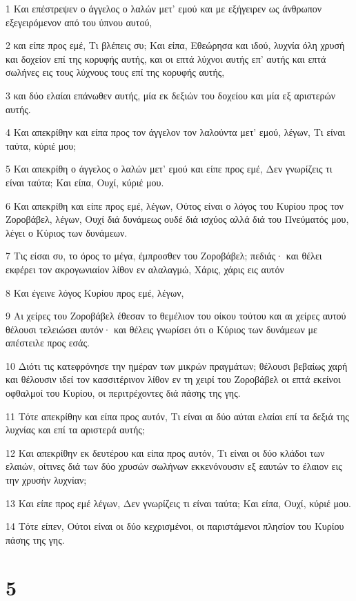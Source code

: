 \par 1 Και επέστρεψεν ο άγγελος ο λαλών μετ' εμού και με εξήγειρεν ως άνθρωπον εξεγειρόμενον από του ύπνου αυτού,
\par 2 και είπε προς εμέ, Τι βλέπεις συ; Και είπα, Εθεώρησα και ιδού, λυχνία όλη χρυσή και δοχείον επί της κορυφής αυτής, και οι επτά λύχνοι αυτής επ' αυτής και επτά σωλήνες εις τους λύχνους τους επί της κορυφής αυτής,
\par 3 και δύο ελαίαι επάνωθεν αυτής, μία εκ δεξιών του δοχείου και μία εξ αριστερών αυτής.
\par 4 Και απεκρίθην και είπα προς τον άγγελον τον λαλούντα μετ' εμού, λέγων, Τι είναι ταύτα, κύριέ μου;
\par 5 Και απεκρίθη ο άγγελος ο λαλών μετ' εμού και είπε προς εμέ, Δεν γνωρίζεις τι είναι ταύτα; Και είπα, Ουχί, κύριέ μου.
\par 6 Και απεκρίθη και είπε προς εμέ, λέγων, Ούτος είναι ο λόγος του Κυρίου προς τον Ζοροβάβελ, λέγων, Ουχί διά δυνάμεως ουδέ διά ισχύος αλλά διά του Πνεύματός μου, λέγει ο Κύριος των δυνάμεων.
\par 7 Τις είσαι συ, το όρος το μέγα, έμπροσθεν του Ζοροβάβελ; πεδιάς· και θέλει εκφέρει τον ακρογωνιαίον λίθον εν αλαλαγμώ, Χάρις, χάρις εις αυτόν
\par 8 Και έγεινε λόγος Κυρίου προς εμέ, λέγων,
\par 9 Αι χείρες του Ζοροβάβελ έθεσαν το θεμέλιον του οίκου τούτου και αι χείρες αυτού θέλουσι τελειώσει αυτόν· και θέλεις γνωρίσει ότι ο Κύριος των δυνάμεων με απέστειλε προς εσάς.
\par 10 Διότι τις κατεφρόνησε την ημέραν των μικρών πραγμάτων; θέλουσι βεβαίως χαρή και θέλουσιν ιδεί τον κασσιτέρινον λίθον εν τη χειρί του Ζοροβάβελ οι επτά εκείνοι οφθαλμοί του Κυρίου, οι περιτρέχοντες διά πάσης της γης.
\par 11 Τότε απεκρίθην και είπα προς αυτόν, Τι είναι αι δύο αύται ελαίαι επί τα δεξιά της λυχνίας και επί τα αριστερά αυτής;
\par 12 Και απεκρίθην εκ δευτέρου και είπα προς αυτόν, Τι είναι οι δύο κλάδοι των ελαιών, οίτινες διά των δύο χρυσών σωλήνων εκκενόνουσιν εξ εαυτών το έλαιον εις την χρυσήν λυχνίαν;
\par 13 Και είπε προς εμέ λέγων, Δεν γνωρίζεις τι είναι ταύτα; Και είπα, Ουχί, κύριέ μου.
\par 14 Τότε είπεν, Ούτοι είναι οι δύο κεχρισμένοι, οι παριστάμενοι πλησίον του Κυρίου πάσης της γης.

\chapter{5}

